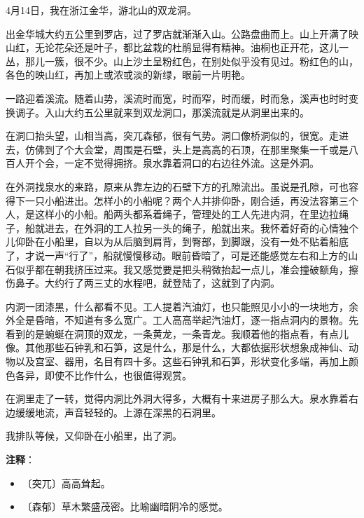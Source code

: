 \documentclass[12pt,UTF-8,openany]{ctexbook}
\begin{document}
\begin{Large}
    
    4月14日，我在浙江金华，游北山的双龙洞。
    
    出金华城大约五公里到罗店，过了罗店就渐渐入山。公路盘曲而上。山上开满了映山红，无论花朵还是叶子，都比盆栽的杜鹃显得有精神。油桐也正开花，这儿一丛，那儿一簇，很不少。山上沙土呈粉红色，在别处似乎没有见过。粉红色的山，各色的映山红，再加上或浓或淡的新绿，眼前一片明艳。
    
    一路迎着溪流。随着山势，溪流时而宽，时而窄，时而缓，时而急，溪声也时时变换调子。入山大约五公里就来到双龙洞口，那溪流就是从洞里出来的。
    
    在洞口抬头望，山相当高，突兀森郁，很有气势。洞口像桥洞似的，很宽。走进去，仿佛到了个大会堂，周围是石壁，头上是高高的石顶，在那里聚集一千或是八百人开个会，一定不觉得拥挤。泉水靠着洞口的右边往外流。这是外洞。
    
    在外洞找泉水的来路，原来从靠左边的石壁下方的孔隙流出。虽说是孔隙，可也容得下一只小船进出。怎样小的小船呢？两个人并排仰卧，刚合适，再没法容第三个人，是这样小的小船。船两头都系着绳子，管理处的工人先进内洞，在里边拉绳子，船就进去，在外洞的工人拉另一头的绳子，船就出来。我怀着好奇的心情独个儿仰卧在小船里，自以为从后脑到肩背，到臀部，到脚跟，没有一处不贴着船底了，才说一声“行了”，船就慢慢移动。眼前昏暗了，可是还能感觉左右和上方的山石似乎都在朝我挤压过来。我又感觉要是把头稍微抬起一点儿，准会撞破额角，擦伤鼻子。大约行了两三丈的水程吧，就登陆了，这就到了内洞。
    
    内洞一团漆黑，什么都看不见。工人提着汽油灯，也只能照见小小的一块地方，余外全是昏暗，不知道有多么宽广。工人高高举起汽油灯，逐一指点洞内的景物。先看到的是蜿蜒在洞顶的双龙，一条黄龙，一条青龙。我顺着他的指点看，有点儿像。其他那些石钟乳和石笋，这是什么，那是什么，大都依据形状想象成神仙、动物以及宫室、器用，名目有四十多。这些石钟乳和石笋，形状变化多端，再加上颜色各异，即使不比作什么，也很值得观赏。
    
    在洞里走了一转，觉得内洞比外洞大得多，大概有十来进房子那么大。泉水靠着右边缓缓地流，声音轻轻的。上源在深黑的石洞里。
    
    我排队等候，又仰卧在小船里，出了洞。
    
\end{Large}


\newpage

\textbf{注释}：

\vspace{-1em}

\begin{itemize}
    \setlength\itemsep{-0.2em}
    \item 〔突兀〕高高耸起。
    \item 〔森郁〕草木繁盛茂密。比喻幽暗阴冷的感觉。
\end{itemize}
\end{document}
